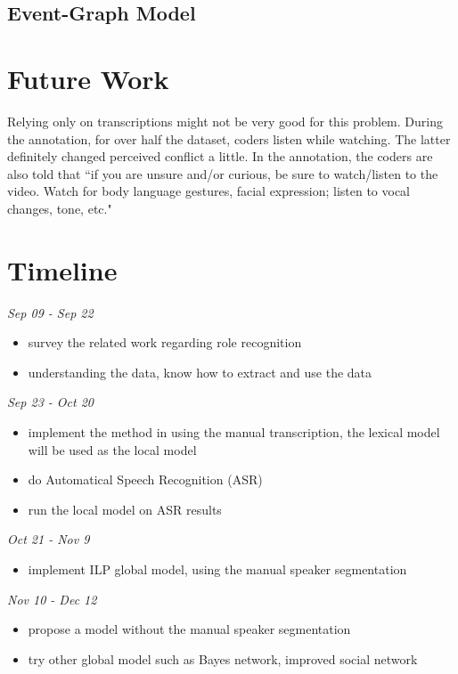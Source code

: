 \documentclass[11pt,letterpaper]{article}
\begin{document}
\subsection{Event-Graph Model}

\section{Future Work}
Relying only on transcriptions might not be very good for this problem. During the annotation, for over half the dataset, coders listen while watching. The latter definitely changed perceived conflict a little. In the annotation, the coders are also told that ``if you are unsure and/or curious, be sure to watch/listen to the video. Watch for body language gestures, facial expression; listen to vocal changes, tone, etc."

\section{Timeline}

\noindent \emph{Sep 09 - Sep 22}
\begin{itemize}
  \item survey the related work regarding role recognition
  \item understanding the data, know how to extract and use the data
\end{itemize}

\noindent \emph{Sep 23 -  Oct 20}
\begin{itemize}
  \item implement the method in using the manual transcription, the lexical model will be used as the local model
  \item do Automatical Speech Recognition (ASR)
  \item run the local model on ASR results
\end{itemize}

\noindent \emph{Oct 21 - Nov 9}
\begin{itemize}
  \item implement ILP global model, using the manual speaker segmentation
\end{itemize}

\noindent \emph{Nov 10 - Dec 12}
\begin{itemize}
  \item propose a model without the manual speaker segmentation
  \item try other global model such as Bayes network, improved social network
\end{itemize}
\end{document}
